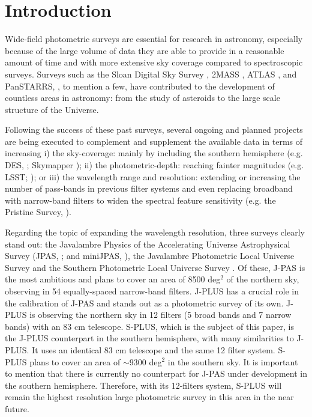\documentclass[fleqn,usenatbib]{mnras}
\begin{document}
\section{Introduction}

Wide-field photometric surveys are essential for research in astronomy, especially because of the large volume of data they are able to provide in a reasonable amount of time and with more extensive sky coverage compared to spectroscopic surveys. Surveys such as the Sloan Digital Sky Survey \citep[SDSS,][]{York+2000}, 2MASS \citep{Skrutskie+2006}, ATLAS \citep{Shanks+2015}, and PanSTARRS, \citep{Chambers+2016}, to mention a few, have contributed to the development of countless areas in astronomy: from the study of asteroids to the large scale structure of the Universe.

Following the success of these past surveys, several ongoing and planned projects are being executed to complement and supplement the available data in terms of increasing i) the sky-coverage: mainly by including the southern hemisphere (e.g. DES, \citealp{Abbott+2018}; Skymapper \citealp{Wolf+2018}); ii) the photometric-depth: reaching fainter magnitudes (e.g. LSST; \citealp{Ivezic+2019}); or iii) the wavelength range and resolution: extending or increasing the number of pass-bands in previous filter systems and even replacing broadband with narrow-band filters to widen the spectral feature sensitivity (e.g. the Pristine Survey, \citealp{Starkenburg+2017}).

Regarding the topic of expanding the wavelength resolution, three surveys clearly stand out: the Javalambre Physics of the Accelerating Universe Astrophysical Survey (JPAS, \citealp{Benitez+2014}; and miniJPAS, \citealp{Bonoli+2020}), the Javalambre Photometric Local Universe Survey \citep[J-PLUS,][]{Cenarro+2019} and the Southern Photometric Local Universe Survey \citep[S-PLUS,][]{MendesDeOliveira+2019}. Of these, J-PAS is the most ambitious and plans to cover an area of 8500 deg$^2$ of the northern sky, observing in 54 equally-spaced narrow-band filters. J-PLUS has a crucial role in the calibration of J-PAS and stands out as a photometric survey of its own. J-PLUS is observing the northern sky in 12 filters (5 broad bands and 7 narrow bands) with an 83 cm telescope. S-PLUS, which is the subject of this paper, is the J-PLUS counterpart in the southern hemisphere, with many similarities to J-PLUS. It uses an identical 83 cm telescope and the same 12 filter system. S-PLUS plans to cover an area of $\sim9300$ deg$^2$ in the southern sky. It is important to mention that there is currently no counterpart for J-PAS under development in the southern hemisphere. Therefore, with its 12-filters system, S-PLUS will remain the highest resolution large photometric survey in this area in the near future. 
\end{document}
